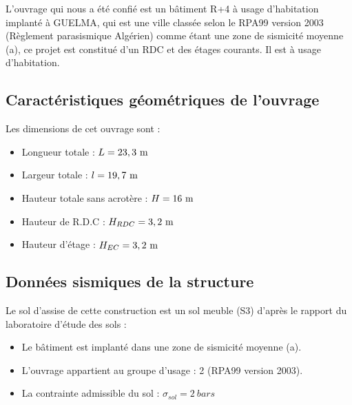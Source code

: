 \documentclass[12pt,a4paper]{report}
\newcommand{\RomanNum}[1] %
{\MakeUppercase{\romannumeral #1}}
\numberwithin{equation}{section}
\newcommand{\sgma}[1]{\sigma_{#1}}
\begin{document}
	
	L’ouvrage qui nous a été confié est un bâtiment R+4 à usage d’habitation implanté à GUELMA, qui est une ville classée selon le RPA99 version 2003 (Règlement parasismique Algérien) comme étant une zone de sismicité moyenne (\RomanNum{2}a), ce projet est constitué d’un RDC et des étages courants. Il est à usage d’habitation.
	
	
	\subsection{Caractéristiques géométriques de l’ouvrage}
	
	Les dimensions de cet ouvrage sont :
	
	\begin{itemize}
		\item Longueur totale : $L = 23,3\meterl$
		
		\item Largeur totale : $l = 19,7\meterl$
		
		\item Hauteur totale sans acrotère : $H = 16\meterl$
		
		\item Hauteur de R.D.C : $H_{RDC} = 3,2\meterl$
		
		\item Hauteur d’étage : $H_{EC} = 3,2\meterl$
	\end{itemize}
	
	
	
	\subsection{Données sismiques de la structure}
	
	Le sol d’assise de cette construction est un sol meuble (S3) d’après le rapport du laboratoire d’étude des sols :
	
	\begin{itemize}
		\item Le bâtiment est implanté dans une zone de sismicité moyenne (\RomanNum{2}a)\footnotemark[1].
		
		\item L’ouvrage appartient au groupe d’usage : 2 (RPA99 version 2003)\footnotemark[1].
		
		\item La contrainte admissible du sol : $\sgma{sol} = 2 ~\unit{bars}$
	\end{itemize}
	
	
\end{document}
